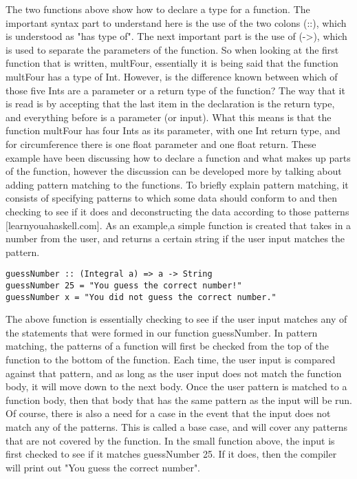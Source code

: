 \documentclass{article}
\begin{document}
The two functions above show how to declare a type for a function.
The important syntax part to understand here is the use of the two colons (::), which is understood as "has type of".
The next important part is the use of (->), which is used to separate the parameters of the function.
So when looking at the first function that is written, multFour, essentially it is being said that the function multFour has a type of Int.
However, is the difference known between which of those five Ints are a parameter or a return type of the function?
The way that it is read is by accepting that the last item in the declaration is the return type, and everything before is a parameter (or input).
What this means is that the function multFour has four Ints as its parameter, with one Int return type, and for circumference there is one float parameter and one float return.
These example have been discussing how to declare a function and what makes up parts of the function, however the discussion can be developed more by talking about adding pattern matching to the functions.
To briefly explain pattern matching, it consists of specifying patterns to which some data should conform to and then checking to see if it does and deconstructing the data according to those patterns \cite{5}[learnyouahaskell.com]. As an example,a simple function is created that takes in a number from the user, and returns a certain string if the user input matches the pattern.
\begin{lstlisting}
guessNumber :: (Integral a) => a -> String
guessNumber 25 = "You guess the correct number!"
guessNumber x = "You did not guess the correct number."
\end{lstlisting}
The above function is essentially checking to see if the user input matches any of the statements that were formed in our function guessNumber.
In pattern matching, the patterns of a function will first be checked from the top of the function to the bottom of the function.
Each time, the user input is compared against that pattern, and as long as the user input does not match the function body, it will move down to the next body.
Once the user pattern is matched to a function body, then that body that has the same pattern as the input will be run.
Of course, there is also a need for a case in the event that the input does not match any of the patterns.
This is called a base case, and will cover any patterns that are not covered by the function.
In the small function above, the input is first checked to see if it matches guessNumber 25.
If it does, then the compiler will print out "You guess the correct number".
\end{document}
